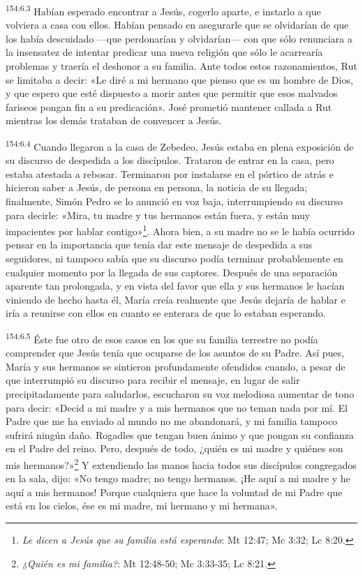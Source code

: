 \par
\textsuperscript{154:6.3} Habían esperado encontrar a Jesús, cogerlo aparte, e instarlo a que volviera a casa con ellos. Habían pensado en asegurarle que se olvidarían de que los había descuidado ---que perdonarían y olvidarían--- con que sólo renunciara a la insensatez de intentar predicar una nueva religión que sólo le acarrearía problemas y traería el deshonor a su familia. Ante todos estos razonamientos, Rut se limitaba a decir: «Le diré a mi hermano que pienso que es un hombre de Dios, y que espero que esté dispuesto a morir antes que permitir que esos malvados fariseos pongan fin a su predicación». José prometió mantener callada a Rut mientras los demás trataban de convencer a Jesús.

\par
\textsuperscript{154:6.4} Cuando llegaron a la casa de Zebedeo, Jesús estaba en plena exposición de su discurso de despedida a los discípulos. Trataron de entrar en la casa, pero estaba atestada a rebosar. Terminaron por instalarse en el pórtico de atrás e hicieron saber a Jesús, de persona en persona, la noticia de su llegada; finalmente, Simón Pedro se lo anunció en voz baja, interrumpiendo su discurso para decirle: «Mira, tu madre y tus hermanos están fuera, y están muy impacientes por hablar contigo»\footnote{\textit{Le dicen a Jesús que su familia está esperando}: Mt 12:47; Mc 3:32; Lc 8:20.}. Ahora bien, a su madre no se le había ocurrido pensar en la importancia que tenía dar este mensaje de despedida a sus seguidores, ni tampoco sabía que su discurso podía terminar probablemente en cualquier momento por la llegada de sus captores. Después de una separación aparente tan prolongada, y en vista del favor que ella y sus hermanos le hacían viniendo de hecho hasta él, María creía realmente que Jesús dejaría de hablar e iría a reunirse con ellos en cuanto se enterara de que lo estaban esperando.

\par
\textsuperscript{154:6.5} Éste fue otro de esos casos en los que su familia terrestre no podía comprender que Jesús tenía que ocuparse de los asuntos de su Padre. Así pues, María y sus hermanos se sintieron profundamente ofendidos cuando, a pesar de que interrumpió su discurso para recibir el mensaje, en lugar de salir precipitadamente para saludarlos, escucharon su voz melodiosa aumentar de tono para decir: «Decid a mi madre y a mis hermanos que no teman nada por mí. El Padre que me ha enviado al mundo no me abandonará, y mi familia tampoco sufrirá ningún daño. Rogadles que tengan buen ánimo y que pongan su confianza en el Padre del reino. Pero, después de todo, ¿quién es mi madre y quiénes son mis hermanos?»\footnote{\textit{¿Quién es mi familia?}: Mt 12:48-50; Mc 3:33-35; Lc 8:21.} Y extendiendo las manos hacia todos sus discípulos congregados en la sala, dijo: «No tengo madre; no tengo hermanos. ¡He aquí a mi madre y he aquí a mis hermanos! Porque cualquiera que hace la voluntad de mi Padre que está en los cielos, ése es mi madre, mi hermano y mi hermana».

